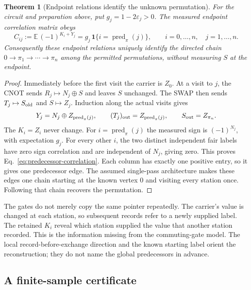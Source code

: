 \documentclass[12pt,a4paper]{article}
\newtheorem{theorem}{Theorem}[section]
\begin{document}
\begin{theorem}[Endpoint relations identify the unknown permutation]
\label{thm:label-order}
For the circuit and preparation above, put $g_j=1-2\varepsilon_j>0$.
The measured endpoint correlation matrix obeys
\begin{equation}
 C_{ij}:=\mathbb E\,(-1)^{K_i+Y_j}
       =g_j\,\mathbf1\{i=\operatorname{pred}_\pi(j)\},
 \qquad i=0,\ldots,n,\quad j=1,\ldots,n .
 \label{eq:predecessor-correlation}
\end{equation}
Consequently these endpoint relations uniquely identify the directed
chain $0\to\pi_1\to\cdots\to\pi_n$ among the permitted permutations,
without measuring $S$ at the endpoint.
\end{theorem}
\begin{proof}
Immediately before the first visit the carrier is $Z_0$.
At a visit to $j$, the CNOT sends
$R_j\mapsto N_j\oplus S$ and leaves $S$ unchanged.
The SWAP then sends $T_j\mapsto S_{\rm old}$ and
$S\mapsto Z_j$. Induction along the actual visits gives
\begin{equation}
 Y_j=N_j\oplus Z_{\operatorname{pred}_\pi(j)},\qquad
 (T_j)_{\rm out}=Z_{\operatorname{pred}_\pi(j)},\qquad
 S_{\rm out}=Z_{\pi_n}.
 \label{eq:full-label-output}
\end{equation}
The $K_i=Z_i$ never change.
For $i=\operatorname{pred}_\pi(j)$ the measured sign is
$(-1)^{N_j}$, with expectation $g_j$.
For every other $i$, the two distinct independent fair labels have
zero sign correlation and are independent of $N_j$, giving zero.
This proves Eq.~\eqref{eq:predecessor-correlation}.
Each column has exactly one positive entry, so it gives one
predecessor edge. The assumed single-pass architecture makes these
edges one chain starting at the known vertex $0$ and visiting
every station once. Following that chain recovers the permutation.
\end{proof}

The gates do not merely copy the same pointer repeatedly.
The carrier's value is changed at each station, so subsequent records
refer to a newly supplied label. The retained $K_i$ reveal which
station supplied the value that another station recorded.
This is the information missing from the commuting-gate model.
The local record-before-exchange direction and the known starting
label orient the reconstruction; they do not name the global
predecessors in advance.

\subsection{A finite-sample certificate}
\end{document}
